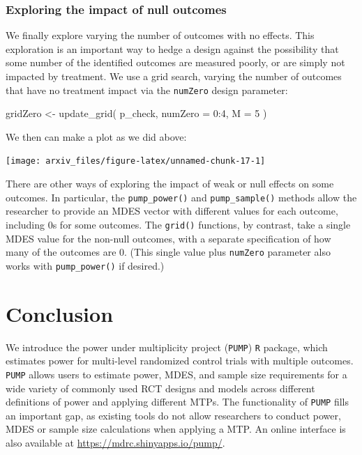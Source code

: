 \documentclass{article}
\newenvironment{Shaded}{\begin{snugshade}}{\end{snugshade}}
\newcommand{\AttributeTok}[1]{\textcolor[rgb]{0.77,0.63,0.00}{#1}}
\newcommand{\DecValTok}[1]{\textcolor[rgb]{0.00,0.00,0.81}{#1}}
\newcommand{\FunctionTok}[1]{\textcolor[rgb]{0.00,0.00,0.00}{#1}}
\newcommand{\NormalTok}[1]{#1}
\newcommand{\OtherTok}[1]{\textcolor[rgb]{0.56,0.35,0.01}{#1}}
\newcommand{\SpecialCharTok}[1]{\textcolor[rgb]{0.00,0.00,0.00}{#1}}
\begin{document}
\subsubsection{Exploring the impact of null outcomes}

We finally explore varying the number of outcomes with no effects. This
exploration is an important way to hedge a design against the
possibility that some number of the identified outcomes are measured
poorly, or are simply not impacted by treatment. We use a grid search,
varying the number of outcomes that have no treatment impact via the
\texttt{numZero} design parameter:

\begin{Shaded}
\begin{Highlighting}[]
\NormalTok{gridZero }\OtherTok{\textless{}{-}} \FunctionTok{update\_grid}\NormalTok{( p\_check,}
                           \AttributeTok{numZero =} \DecValTok{0}\SpecialCharTok{:}\DecValTok{4}\NormalTok{,}
                         \AttributeTok{M =} \DecValTok{5}\NormalTok{ )}
\end{Highlighting}
\end{Shaded}

We then can make a plot as we did above:

\begin{center}\texttt{[image: arxiv\_files/figure-latex/unnamed-chunk-17-1]} \end{center}

There are other ways of exploring the impact of weak or null effects on
some outcomes. In particular, the \texttt{pump\_power()} and
\texttt{pump\_sample()} methods allow the researcher to provide an MDES
vector with different values for each outcome, including 0s for some
outcomes. The \texttt{grid()} functions, by contrast, take a single MDES
value for the non-null outcomes, with a separate specification of how
many of the outcomes are 0. (This single value plus \texttt{numZero}
parameter also works with \texttt{pump\_power()} if desired.)

\section{Conclusion}
\label{sec:conclusion}

We introduce the power under multiplicity project (\texttt{PUMP})
\texttt{R} package, which estimates power for multi-level randomized
control trials with multiple outcomes. \texttt{PUMP} allows users to
estimate power, MDES, and sample size requirements for a wide variety of
commonly used RCT designs and models across different definitions of
power and applying different MTPs. The functionality of \texttt{PUMP}
fills an important gap, as existing tools do not allow researchers to
conduct power, MDES or sample size calculations when applying a MTP. An
online interface is also available at
\url{https://mdrc.shinyapps.io/pump/}.
\end{document}
